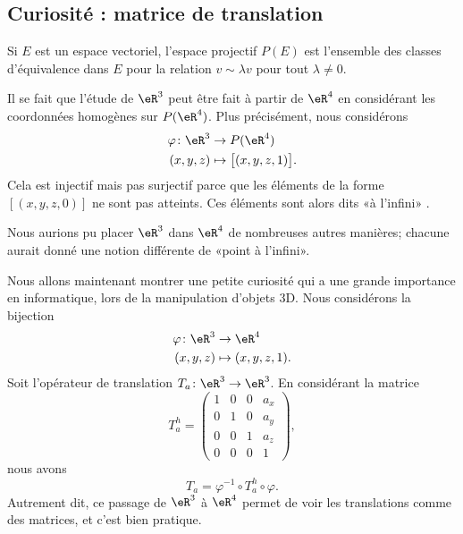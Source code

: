 \subsection{Curiosité : matrice de translation}

Si \( E\) est un espace vectoriel, l'espace projectif \( P(E)\) est l'ensemble des classes d'équivalence dans \( E\) pour la relation \( v\sim \lambda v\) pour tout \( \lambda\neq 0\).

Il se fait que l'étude de \( \eR^3\) peut être fait à partir de \( \eR^4\) en considérant les coordonnées homogènes sur \( P(\eR^4)\). Plus précisément, nous considérons
\begin{equation}
	\begin{aligned}
		\varphi\colon \eR^3 & \to P(\eR^4)                   \\
		(x,y,z)             & \mapsto \big[ (x,y,z,1) \big].
	\end{aligned}
\end{equation}
Cela est injectif mais pas surjectif parce que les éléments de la forme \( [(x,y,z,0)]\) ne sont pas atteints. Ces éléments sont alors dits «à l'infini» .

Nous aurions pu placer \( \eR^3\) dans \( \eR^4\) de nombreuses autres manières; chacune aurait donné une notion différente de «point à l'infini».

Nous allons maintenant montrer une petite curiosité qui a une grande importance en informatique, lors de la manipulation d'objets 3D. Nous considérons la bijection
\begin{equation}
	\begin{aligned}
		\varphi\colon \eR^3 & \to \eR^4          \\
		(x,y,z)             & \mapsto (x,y,z,1).
	\end{aligned}
\end{equation}
Soit l'opérateur de translation \( T_a\colon \eR^3\to \eR^3\). En considérant la matrice
\begin{equation}
	T^h_a=\begin{pmatrix}
		1 & 0 & 0 & a_x \\
		0 & 1 & 0 & a_y \\
		0 & 0 & 1 & a_z \\
		0 & 0 & 0 & 1
	\end{pmatrix},
\end{equation}
nous avons
\begin{equation}
	T_a=\varphi^{-1}\circ T_a^h\circ \varphi.
\end{equation}
Autrement dit, ce passage de \( \eR^3\) à \( \eR^4\) permet de voir les translations comme des matrices, et c'est bien pratique.

